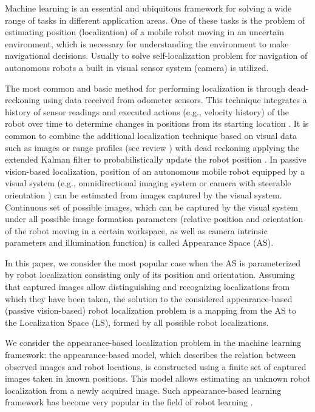 \documentclass[conference]{IEEEtran} %
\begin{document}
Machine learning is an essential and ubiquitous framework for solving a wide range of tasks in different application areas. One of these tasks is the problem of estimating position (localization) of a mobile robot moving in an uncertain environment, which is necessary for understanding the environment to make navigational decisions. Usually to solve self-localization problem for navigation of autonomous robots a built in visual sensor system (camera) is utilized.

The most common and basic method for performing localization is through dead-reckoning using data received from odometer sensors. This technique integrates a history of sensor readings and executed actions (e.g., velocity history) of the robot over time to determine changes in positions from its starting location \cite{bib1,bib2,bib3}. It is common to combine the additional localization technique based on visual data such as images or range profiles (see review \cite{bib4}) with dead reckoning applying the extended Kalman filter to probabilistically update the robot position \cite{bib5,bib6}. In passive vision-based localization, position of an autonomous mobile robot equipped by a visual system (e.g., omnidirectional imaging system \cite{bib7,bib8,bib9} or camera with steerable orientation \cite{bib10}) can be estimated from images captured by the visual system. Continuous set of possible images, which can be captured by the visual system under all possible image formation parameters (relative position and orientation of the robot moving in a certain workspace, as well as camera intrinsic parameters and illumination function) is called Appearance Space (AS). 

In this paper, we consider the most popular case when the AS is parameterized by robot localization  consisting only of its position and orientation. Assuming that captured images allow distinguishing and recognizing localizations from which they have been taken, the solution to the considered appearance-based (passive vision-based) robot localization problem is a mapping from the AS to the Localization Space (LS), formed by all possible robot localizations.

We consider the appearance-based localization problem in the machine learning framework: the appearance-based model, which describes the relation between observed images and robot locations, is constructed using a finite set of captured images taken in known positions. This model allows estimating an unknown robot localization from a newly acquired image. Such appearance-based learning framework has become very popular in the field of robot learning \cite{bib11}.
\end{document}
